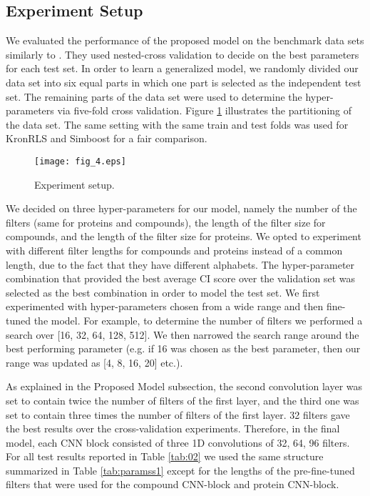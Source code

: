 \documentclass[11pt,letterpaper]{article}
\begin{document}
\subsection*{Experiment Setup}

We evaluated the performance of the proposed model on the benchmark data sets \cite{davis2011comprehensive,tang2014making} similarly to \cite{he2017simboost}. They used nested-cross validation to decide on the best parameters for each test set. In order to learn a generalized model, we randomly divided our data set into six equal parts in which one part is selected as the independent test set. The remaining parts of the data set were used to determine the hyper-parameters via five-fold cross validation. Figure \ref{fig:04} illustrates the partitioning of the data set. The same setting with the same train and test folds was used for  KronRLS \cite{pahikkala2014toward} and Simboost \cite{he2017simboost} for a fair comparison.

\begin{figure}[h]\centerline{\texttt{[image: fig\_4.eps]}}
\caption{Experiment setup.}\label{fig:04}
\end{figure}

We decided on three hyper-parameters for our model,  namely the number of the filters (same for proteins and compounds), the length of the filter size for compounds, and the length of the filter size for proteins.  We opted to experiment with different filter lengths for compounds and proteins instead of a common length, due to the fact that they have different alphabets. The  hyper-parameter combination that provided the best average CI score over the validation set was selected as the best combination in order to model the test set.  We first experimented with hyper-parameters chosen from a wide range and then fine-tuned the model. For example, to determine the number of filters we performed a search over [16, 32, 64, 128, 512].  We then narrowed the search range around the best performing parameter (e.g. if 16 was chosen as the best parameter, then our range was updated as [4, 8, 16, 20] etc.). 

As explained in the Proposed Model subsection, the second convolution layer was set to contain twice the number of filters of the first layer, and the third one was set to contain three times the number of filters of the first layer. 32 filters gave the best results over the cross-validation experiments. Therefore, in the final model, each CNN block consisted of three 1D convolutions of 32, 64, 96 filters. For all test results reported in Table \ref{tab:02} we used the same structure summarized in Table \ref{tab:paramss1} except for the lengths of the pre-fine-tuned filters that were used for the compound CNN-block and protein CNN-block.  
\end{document}
